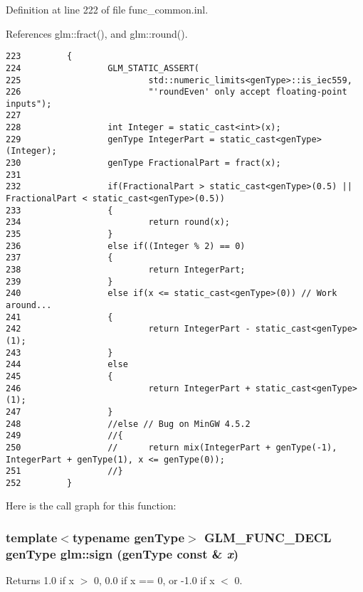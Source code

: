 Definition at line 222 of file func\_\-common.inl.

References glm::fract(), and glm::round().

\begin{Code}\begin{verbatim}223         {
224                 GLM_STATIC_ASSERT(
225                         std::numeric_limits<genType>::is_iec559,
226                         "'roundEven' only accept floating-point inputs");
227                 
228                 int Integer = static_cast<int>(x);
229                 genType IntegerPart = static_cast<genType>(Integer);
230                 genType FractionalPart = fract(x);
231 
232                 if(FractionalPart > static_cast<genType>(0.5) || FractionalPart < static_cast<genType>(0.5))
233                 {
234                         return round(x);
235                 }
236                 else if((Integer % 2) == 0)
237                 {
238                         return IntegerPart;
239                 }
240                 else if(x <= static_cast<genType>(0)) // Work around... 
241                 {
242                         return IntegerPart - static_cast<genType>(1);
243                 }
244                 else
245                 {
246                         return IntegerPart + static_cast<genType>(1);
247                 }
248                 //else // Bug on MinGW 4.5.2
249                 //{
250                 //      return mix(IntegerPart + genType(-1), IntegerPart + genType(1), x <= genType(0));
251                 //}
252         }
\end{verbatim}
\end{Code}




Here is the call graph for this function:\hypertarget{group__core__func__common_g74ce53889485c33ac9d81d2b27165c80}{
\subsubsection[sign]{\setlength{\rightskip}{0pt plus 5cm}template$<$typename genType$>$ GLM\_\-FUNC\_\-DECL genType glm::sign (genType const \& {\em x})}}
\label{group__core__func__common_g74ce53889485c33ac9d81d2b27165c80}


Returns 1.0 if x $>$ 0, 0.0 if x == 0, or -1.0 if x $<$ 0.

